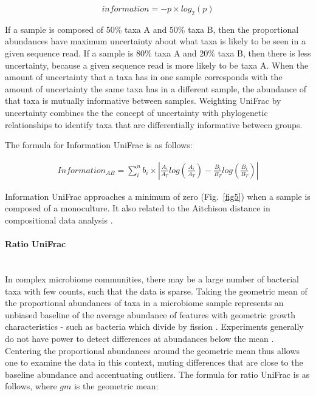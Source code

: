 \documentclass[10pt,letterpaper]{article}
\begin{document}
\begin{equation}\label{eq:schemeP} 
information = - p  \times log_{2}(p)
\end{equation}

If a sample is composed of 50\% taxa A and 50\% taxa B, then the proportional abundances have maximum uncertainty about what taxa is likely to be seen in a given sequence read. If a sample is 80\% taxa A and 20\% taxa B, then there is less uncertainty, because a given sequence read is more likely to be taxa A. When the amount of uncertainty that a taxa has in one sample corresponds with the amount of uncertainty the same taxa has in a different sample, the abundance of that taxa is mutually informative between samples. Weighting UniFrac by uncertainty combines the the concept of uncertainty with phylogenetic relationships to identify taxa that are differentially informative between groups.

The formula for Information UniFrac is as follows:

\begin{align*}
Information_{AB} = \sum_{i}^{n} b_{i} \times \left| \frac{A_{i}}{A_{T}}log\left(\frac{A_{i}}{A_{T}}\right) - \frac{B_{i}}{B_{T}}log\left(\frac{B_{i}}{B_{T}}\right) \right|
\end{align*}

Information UniFrac approaches a minimum of zero (Fig.~\ref{fig5}) when a sample is composed of a monoculture. It also related to the Aitchison distance in compositional data analysis \cite{egozcue2011evidence}.

\paragraph{Ratio UniFrac}\mbox{}\\
In complex microbiome communities, there may be a large number of bacterial taxa with few counts, such that the data is sparse. Taking the geometric mean of the proportional abundances of taxa in a microbiome sample represents an unbiased baseline of the average abundance of features with geometric growth characteristics - such as bacteria which divide by fission \cite{aitchison1982statistical}. Experiments generally do not have power to detect differences at abundances below the mean \cite{fernandes2013anova}. Centering the proportional abundances around the geometric mean thus allows one to examine the data in this context, muting differences that are close to the baseline abundance and accentuating outliers. The formula for ratio UniFrac is as follows, where $gm$ is the geometric mean:
\end{document}
